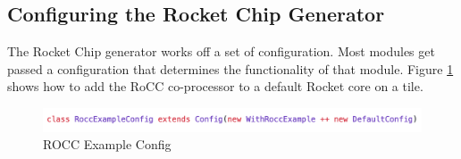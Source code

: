\documentclass[../main.tex]{subfiles}
\begin{document}
\subsection{Configuring the Rocket Chip Generator}
The Rocket Chip generator works off a set of configuration. Most modules get passed a configuration that determines the functionality of that module. Figure \ref{fig:configsnipit} shows how to add the RoCC co-processor to a default Rocket core on a tile.
\begin{figure}
    \centering
    \includegraphics[scale=.4]{pngs/ConfigSnipit.png}
    \caption{ROCC Example Config}
    \label{fig:configsnipit}
\end{figure}
\end{document}
